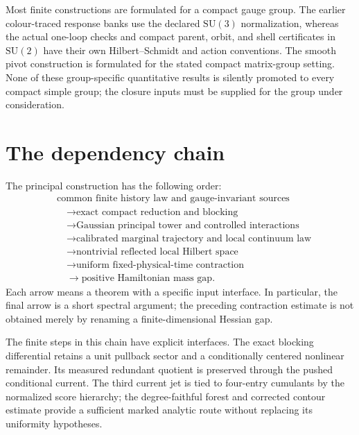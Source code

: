 \documentclass[11pt,oneside,openany]{book}
\theoremstyle{definition}
\theoremstyle{remark}
\newcommand{\SU}{\mathrm{SU}}
\begin{document}
Most finite constructions are formulated for a compact gauge group. The earlier colour-traced response banks use the declared $\SU(3)$ normalization, whereas the actual one-loop checks and compact parent, orbit, and shell certificates in $\SU(2)$ have their own Hilbert--Schmidt and action conventions. The smooth pivot construction is formulated for the stated compact matrix-group setting. None of these group-specific quantitative results is silently promoted to every compact simple group; the closure inputs must be supplied for the group under consideration.

\section{The dependency chain}
The principal construction has the following order:
\begin{equation}\label{eq:main-chain}
\begin{aligned}
&\text{common finite history law and gauge-invariant sources}\\
&\quad\longrightarrow\text{exact compact reduction and blocking}\\
&\quad\longrightarrow\text{Gaussian principal tower and controlled interactions}\\
&\quad\longrightarrow\text{calibrated marginal trajectory and local continuum law}\\
&\quad\longrightarrow\text{nontrivial reflected local Hilbert space}\\
&\quad\longrightarrow\text{uniform fixed-physical-time contraction}\\
&\quad\longrightarrow\text{positive Hamiltonian mass gap}.
\end{aligned}
\end{equation}
Each arrow means a theorem with a specific input interface. In particular, the final arrow is a short spectral argument; the preceding contraction estimate is not obtained merely by renaming a finite-dimensional Hessian gap.

The finite steps in this chain have explicit interfaces. The exact
blocking differential retains a unit pullback sector and a conditionally
centered nonlinear remainder. Its measured redundant quotient is
preserved through the pushed conditional current. The third current
jet is tied to four-entry cumulants by the normalized score hierarchy;
the degree-faithful forest and corrected contour estimate provide a
sufficient marked analytic route without replacing its uniformity
hypotheses.
\end{document}
